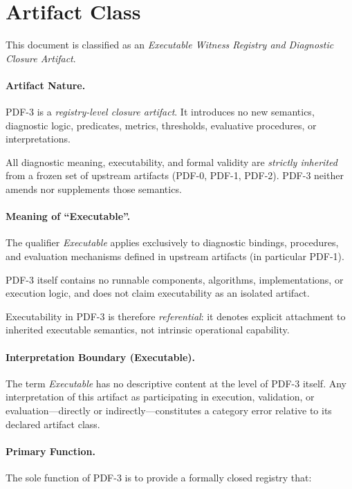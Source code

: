 ﻿\section{Artifact Class}

This document is classified as an
\emph{Executable Witness Registry and Diagnostic Closure Artifact}.

\paragraph{Artifact Nature.}
PDF-3 is a \emph{registry-level closure artifact}.
It introduces no new semantics, diagnostic logic, predicates, metrics,
thresholds, evaluative procedures, or interpretations.

All diagnostic meaning, executability, and formal validity are
\emph{strictly inherited} from a frozen set of upstream artifacts
(PDF-0, PDF-1, PDF-2).
PDF-3 neither amends nor supplements those semantics.

\paragraph{Meaning of ``Executable''.}
The qualifier \emph{Executable} applies exclusively to diagnostic bindings,
procedures, and evaluation mechanisms defined in upstream artifacts
(in particular PDF-1).

PDF-3 itself contains no runnable components, algorithms, implementations,
or execution logic, and does not claim executability as an isolated artifact.

Executability in PDF-3 is therefore \emph{referential}:
it denotes explicit attachment to inherited executable semantics,
not intrinsic operational capability.

\paragraph{Interpretation Boundary (Executable).}
The term \emph{Executable} has no descriptive content at the level of PDF-3 itself.
Any interpretation of this artifact as participating in execution, validation,
or evaluation—directly or indirectly—constitutes a category error relative to
its declared artifact class.

\paragraph{Primary Function.}
The sole function of PDF-3 is to provide a formally closed registry that:


